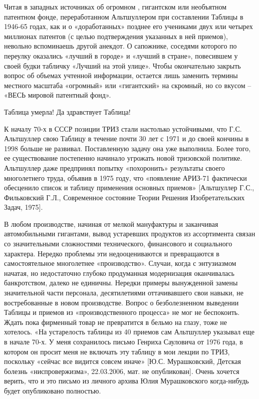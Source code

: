\documentclass[11pt,a4paper]{article}
\begin{document}
Читая в западных источниках об огромном , гигантском или необъятном патентном
фонде, переработанном Альтшуллером при составлении Таблицы в 1946-65 годах,
как и о «доработанных» позднее его учениками двух или четырех миллионах
патентов (с целью подтверждения указанных в ней приемов), невольно вспоминаешь
другой анекдот. О сапожнике, соседями которого по переулку оказались «лучший в
городе» и «лучший в стране», повесившем у своей будки табличку «Лучший на этой
улице». Чтобы окончательно закрыть вопрос об объемах учтенной информации,
остается лишь заменить термины местного масштаба «огромный» или «гигантский»
на скромный, но со вкусом -- «ВЕСЬ мировой патентный фонд».

Таблица умерла! Да здравствует Таблица!

К началу 70-х в СССР позиции ТРИЗ стали настолько устойчивыми, что
Г.С. Альтшуллер свою Таблицу в течение почти 30 лет с 1971 и до своей кончины
в 1998 больше не развивал. Поставленную задачу она уже выполнила. Более того,
ее существование постепенно начинало угрожать новой тризовской
политике. Альтшуллер даже предпринял попытку «похоронить» результаты своего
многолетнего труда, объявив в 1975 году, что «появление АРИЗ-71 фактически
обесценило список и таблицу применения основных приемов» [Альтшуллер Г.С.,
  Фильковский Г.Л., Современное состояние Теории Решения Изобретательских
  Задач, 1975].

В любом производстве, начиная от мелкой мануфактуры и заканчивая
автомобильными гигантами, вывод устаревших продуктов из ассортимента связан со
значительными сложностями технического, финансового и социального характера.
Нередко проблемы эти недооцениваются и превращаются в самостоятельное
многолетнее «производство». Случаи, когда с энтузиазмом начатая, но
недостаточно глубоко продуманная модернизация оканчивалась банкротством,
далеко не единичны. Нередки примеры вынужденной замены значительной части
персонала, десятилетиями оттачивавшего свои навыки, не востребованные в новом
производстве. Вопрос о безболезненном выведении Таблицы и приемов из
«производственного процесса» не мог не беспокоить. Ждать пока фирменный товар
не превратится в бельмо на глазу, тоже не хотелось. «На устарелость таблицы из
40 приемов сам Альтшуллер указывал еще в начале 70-х. У меня сохранилось
письмо Генриха Сауловича от 1976 года, в котором он просит меня не включать
эту таблицу в мои лекции по ТРИЗ, поскольку «сейчас все видится совсем иначе»
[Ю.С. Мурашковский, Детская болезнь «ниспровержизма», 22.03.2006, мат. не
  опубликован]. Очень хочется верить, что и это письмо из личного архива Юлия
Мурашковского когда-нибудь будет опубликовано полностью.
\end{document}
